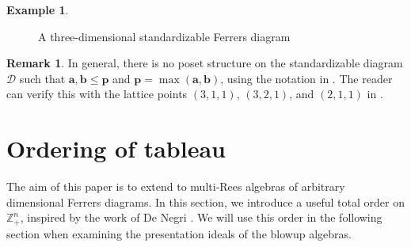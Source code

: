 \documentclass[11pt,a4paper,reqno,dvipsnames]{amsart}
\theoremstyle{plain}
\theoremstyle{definition}
\newtheorem{Assumptions and Discussion}[Theorem]{Assumptions and Discussion}
\newtheorem{Example}[Theorem]{Example}
\newtheorem{Remark}[Theorem]{Remark}
\theoremstyle{remark}
\def\ZZ{{\mathbb Z}}
\newcommand\bda{{\bm a}}
\newcommand\bdb{{\bm b}}
\newcommand\bdp{{\bm p}}
\newcommand\calD{\mathcal{D}}
\begin{document}
\begin{Example}
\begin{center}
\begin{figure}[htbp]
            \caption{A three-dimensional standardizable Ferrers diagram}
            \label{Shadow}
        \end{figure}
    \end{center}
\end{Example}

\begin{Remark}
    In general, there is no poset structure on the standardizable diagram $\calD$ such that $\bda,\bdb\le \bdp$ and $\bdp=\max(\bda,\bdb)$, using the notation in . The reader can verify this with the lattice points $(3,1,1)$, $(3,2,1)$, and $(2,1,1)$ in .
\end{Remark}



\section{Ordering of tableau}

The aim of this paper is to extend  to multi-Rees algebras of arbitrary dimensional Ferrers diagrams. 
In this section, we introduce a useful total order on $\ZZ_+^{n}$, inspired by the work of De Negri \cite{DeNegri}. We will use this order in the following section when examining the presentation ideals of the blowup algebras.
\end{document}
